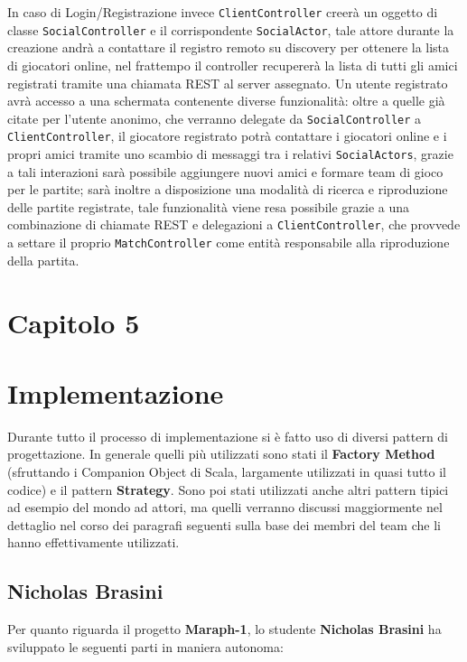     In caso di Login/Registrazione invece \texttt{ClientController} creerà un oggetto di classe \texttt{SocialController} e il corrispondente \texttt{SocialActor}, tale attore durante la creazione andrà a contattare il registro remoto su discovery per ottenere la lista di giocatori online, nel frattempo il controller recupererà la lista di tutti gli amici registrati tramite una chiamata REST al server assegnato. Un utente registrato avrà accesso a una schermata contenente diverse funzionalità: oltre a quelle già citate per l'utente anonimo, che verranno delegate da \texttt{SocialController} a \texttt{ClientController}, il giocatore registrato potrà contattare i giocatori online e i propri amici tramite uno scambio di messaggi tra i relativi \texttt{SocialActors}, grazie a tali interazioni sarà possibile aggiungere nuovi amici e formare team di gioco per le partite; sarà inoltre a disposizione una modalità di ricerca e riproduzione delle partite registrate, tale funzionalità viene resa possibile grazie a una combinazione di chiamate REST e delegazioni a \texttt{ClientController}, che provvede a settare il proprio \texttt{MatchController} come entità responsabile alla riproduzione della partita.

    \clearpage
    \setcounter{figure}{0}

 \section*{\Huge {\textbf Capitolo 5}\label{chapter5}}

     \section{Implementazione}\label{sec:implementation}

     Durante tutto il processo di implementazione si è fatto uso di diversi pattern di progettazione. In generale quelli più utilizzati sono stati il \textbf{Factory Method} (sfruttando i Companion Object di Scala, largamente utilizzati in quasi tutto il codice) e il pattern \textbf{Strategy}. Sono poi stati utilizzati anche altri pattern tipici ad esempio del mondo ad attori, ma quelli verranno discussi maggiormente nel dettaglio nel corso dei paragrafi seguenti sulla base dei membri del team che li hanno effettivamente utilizzati.

        \subsection{Nicholas Brasini}\label{subsec:brasini}
        Per quanto riguarda il progetto \textbf{Maraph-1}, lo studente \textbf{Nicholas Brasini} ha sviluppato le seguenti parti in maniera autonoma:

